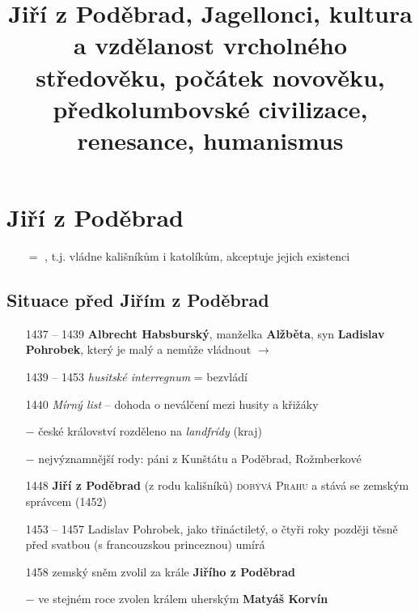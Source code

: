 \documentclass{article}
\title{\vspace{-2cm}Jiří z Poděbrad, Jagellonci, kultura a vzdělanost vrcholného středověku, počátek novověku, předkolumbovské civilizace, renesance, humanismus\vspace{-1.7cm}}
\date{}
\author{}
\begin{document}
\maketitle

\section*{Jiří z Poděbrad}

\begin{itemize}
    \vspace{-0.5em}
    \setlength\itemsep{0.15em}
    \item[$=$] , t.j. vládne kališníkům i katolíkům, akceptuje jejich existenci
\end{itemize}

\subsection*{Situace před Jiřím z Poděbrad}
\begin{itemize}
    \vspace{-0.5em}
    \setlength\itemsep{0.15em}
    \item[1437 -- 1439] \textbf{Albrecht Habsburský}, manželka \textbf{Alžběta}, syn \textbf{Ladislav Pohrobek}, který je malý a nemůže vládnout $\rightarrow$
    \item[1439 -- 1453] \textit{husitské interregnum} = bezvládí
    \item[1440] \textit{Mírný list} -- dohoda o neválčení mezi husity a křižáky
    \item[$-$] české království rozděleno na \textit{landfrídy} (kraj)
    \item[$-$] nejvýznamnější rody: páni z Kunštátu a Poděbrad, Rožmberkové
    \item[1448] \textbf{Jiří z Poděbrad} (z rodu kališníků) \textsc{dobývá Prahu} a stává se zemským správcem (1452)
    \item[1453 -- 1457] Ladislav Pohrobek, jako třináctiletý, o čtyři roky později těsně před svatbou (s francouzskou princeznou) umírá
    \item[1458] zemský sněm zvolil za krále \textbf{Jiřího z Poděbrad}
    \item[$-$] ve stejném roce zvolen králem uherským \textbf{Matyáš Korvín}
\end{itemize}
\end{document}
